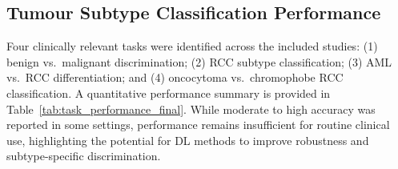 \documentclass[final,british,a4paper,12pt]{phdthesis}
\begin{document}






\subsection{Tumour Subtype Classification Performance}

Four clinically relevant tasks were identified across the included studies: (1) benign vs.\ malignant discrimination; (2) RCC subtype classification; (3) AML vs.\ RCC differentiation; and (4) oncocytoma vs.\ chromophobe RCC classification. A quantitative performance summary is provided in Table~\ref{tab:task_performance_final}. While moderate to high accuracy was reported in some settings, performance remains insufficient for routine clinical use, highlighting the potential for DL methods to improve robustness and subtype-specific discrimination.
\end{document}
